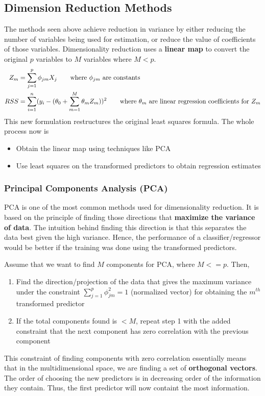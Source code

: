 \documentclass[11pt, a4paper]{article}
\begin{document}
    \subsection{Dimension Reduction Methods}
    The methods seen above achieve reduction in variance by either reducing the number of variables being used for estimation, or reduce the value of coefficients of those variables.\newline
    Dimensionality reduction uses a \textbf{linear map} to convert the original $p$ variables to $M$ variables where $M < p$.
    \begin{align*}
        Z_{m} &= \sum_{j=1}^{p} \phi_{jm}X_{j} \tag*{where $\phi_{jm}$ are constants} \\
        RSS &= \sum_{i=1}^{n} (y_{i} - (\theta_{0}+\sum_{m=1}^{M}\theta_{m}Z_{m}))^{2} \tag*{where $\theta_{m}$ are linear regression coefficients for $Z_{m}$}
    \end{align*}
    This new formulation restructures the original least squares formula. The whole process now is
    \begin{itemize}
        \item Obtain the linear map using techniques like PCA
        \item Use least squares on the transformed predictors to obtain regression estimates
    \end{itemize}


    \subsubsection{Principal Components Analysis (PCA)}
    PCA is one of the most common methods used for dimensionality reduction. It is based on the principle of finding those directions that \textbf{maximize the variance of data}. The intuition behind finding this direction is that this separates the data best given the high variance. Hence, the performance of a classifier/regressor would be better if the training was done using the transformed predictors. \newline

    Assume that we want to find $M$ components for PCA, where $M <= p$. Then,
    \begin{enumerate}
        \item Find the direction/projection of the data that gives the maximum variance under the constraint $\sum_{j=1}^{p}\phi_{jm}^{2} = 1$ (normalized vector) for obtaining the $m^{th}$ transformed predictor
        \item If the total components found is $< M$, repeat step 1 with the added constraint that the next component has zero correlation with the previous component
    \end{enumerate}
    This constraint of finding components with zero correlation essentially means that in the multidimensional space, we are finding a set of \textbf{orthogonal vectors}. The order of choosing the new predictors is in decreasing order of the information they contain. Thus, the first predictor will now containt the most information. \newline
\end{document}
